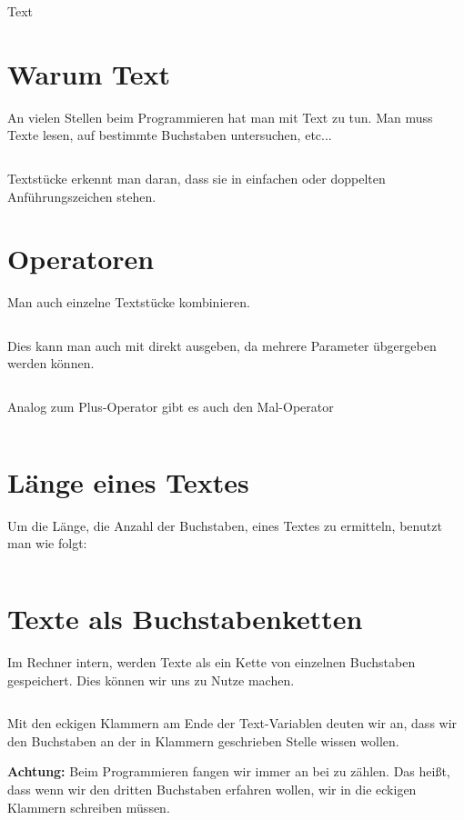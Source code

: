 \documentclass{\VorlagenPfad/coderdojokatext}
\newcommand{\Titel}{Text}
\begin{document}
\begin{center}
	{\huge \Titel}
\end{center}

\section{Warum Text}
An vielen Stellen beim Programmieren hat man mit Text zu tun. Man muss Texte lesen, auf bestimmte Buchstaben untersuchen, etc...
\inputminted[firstline=1, lastline=3]{python}{../../../Beispiele/text.py}

Textstücke erkennt man daran, dass sie in einfachen  oder doppelten  Anführungszeichen  stehen.
\section{Operatoren}
Man auch einzelne Textstücke kombinieren.
\inputminted[firstline=5, lastline=7]{python}{../../../Beispiele/text.py}
Dies kann man auch mit  direkt ausgeben, da mehrere Parameter übgergeben werden können.

\inputminted[firstline=9, lastline=10]{python}{../../../Beispiele/text.py}

Analog zum Plus-Operator gibt es auch den Mal-Operator
\inputminted[firstline=12, lastline=13]{python}{../../../Beispiele/text.py}

\section{Länge eines Textes}
Um die Länge, die Anzahl der Buchstaben, eines Textes zu ermitteln, benutzt man  wie folgt:
\inputminted[firstline=15, lastline=16]{python}{../../../Beispiele/text.py}

\section{Texte als Buchstabenketten}
Im Rechner intern, werden Texte als ein Kette von einzelnen Buchstaben gespeichert. Dies können wir uns zu Nutze machen.
\inputminted[firstline=18, lastline=21]{python}{../../../Beispiele/text.py}
Mit den eckigen Klammern am Ende der Text-Variablen  deuten wir an, 
dass wir den Buchstaben an der in Klammern geschrieben Stelle wissen wollen.
 
\begin{merkbox}
\textbf{Achtung:} Beim Programmieren fangen wir immer an bei  zu zählen.
Das heißt, dass wenn wir den dritten Buchstaben erfahren wollen, wir  in die eckigen Klammern schreiben müssen.
\end{merkbox}
\end{document}
